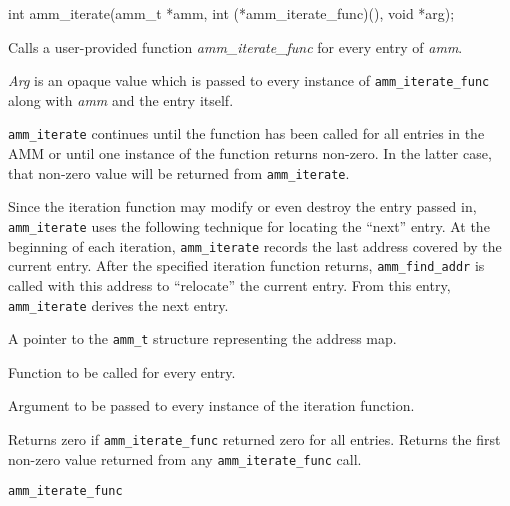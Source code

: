 \begin{apisyn}

	\funcproto int amm_iterate(amm_t *amm,
		int (*amm_iterate_func)(), void *arg);
\end{apisyn}
\begin{apidesc}
	Calls a user-provided function \emph{amm_iterate_func} for every
	entry of \emph{amm}.

	\emph{Arg} is an opaque value which is passed to every instance of
	{\tt amm_iterate_func} along with \emph{amm} and the entry itself.

	{\tt amm_iterate} continues until the function has been called
	for all entries in the AMM or until one instance of the function
	returns non-zero.
	In the latter case,
	that non-zero value will be returned from {\tt amm_iterate}.

	Since the iteration function may modify or even destroy the entry
	passed in, {\tt amm_iterate} uses the following technique for
	locating the ``next'' entry.
	At the beginning of each iteration, {\tt amm_iterate} records the
	last address covered by the current entry.
	After the specified iteration function returns,
	{\tt amm_find_addr} is called with this address to ``relocate''
	the current entry.
	From this entry, {\tt amm_iterate} derives the next entry.
\end{apidesc}
\begin{apiparm}
	\item[amm]
		A pointer to the {\tt amm_t} structure
		representing the address map.
	\item[amm_iterate_func]
		Function to be called for every entry.
	\item[arg]
		Argument to be passed to every instance of the iteration
		function.
\end{apiparm}
\begin{apiret}
	Returns zero if {\tt amm_iterate_func} returned zero for all entries.
	Returns the first non-zero value returned from any
	{\tt amm_iterate_func} call.
\end{apiret}
\begin{apirel}
	{\tt amm_iterate_func}
\end{apirel}


